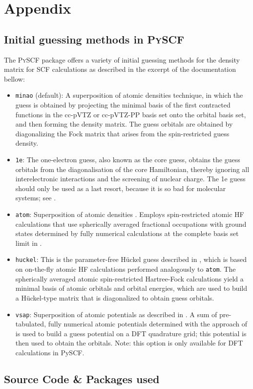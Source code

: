 \appendix
\chapter{Appendix}
\label{sec:appendix}

\section{Initial guessing methods in \textsc{PySCF} \parencite{ref:pyscf}}
\label{sec:pyscf_initial_guessing_methods}
The \textsc{PySCF} package offers a variety of initial guessing methods for the density matrix for SCF calculations as described in the excerpt of the documentation \parencite{ref:pyscf_user_guide} bellow: 
\begin{itemize}
    \item \texttt{minao} (default): A superposition of atomic densities \parencite{ref:minao_sad1,ref:minao_sad2} technique, in which the guess is obtained by projecting the minimal basis of the first contracted functions in the cc-pVTZ or cc-pVTZ-PP basis set onto the orbital basis set, and then forming the density matrix. The guess orbitals are obtained by diagonalizing the Fock matrix that arises from the spin-restricted guess density.

    \item \texttt{1e}: The one-electron guess, also known as the core guess, obtains the guess orbitals from the diagonalisation of the core Hamiltonian, thereby ignoring all interelectronic interactions and the screening of nuclear charge. The 1e guess should only be used as a last resort, because it is so bad for molecular systems; see \parencite{ref:Lehtola2019}.

    \item \texttt{atom}: Superposition of atomic densities \parencite{ref:minao_sad1,ref:minao_sad2}. Employs spin-restricted atomic HF calculations that use spherically averaged fractional occupations with ground states determined by fully numerical calculations at the complete basis set limit in \parencite{ref:lethola_fully_numerical_atomic_potentials}.

    \item \texttt{huckel}: This is the parameter-free Hückel guess described in \parencite{ref:Lehtola2019}, which is based on on-the-fly atomic HF calculations performed analogously to \texttt{atom}. The spherically averaged atomic spin-restricted Hartree-Fock calculations yield a minimal basis of atomic orbitals and orbital energies, which are used to build a Hückel-type matrix that is diagonalized to obtain guess orbitals.

    \item \texttt{vsap}: Superposition of atomic potentials as described in \parencite{ref:Lehtola2019}. A sum of pre-tabulated, fully numerical atomic potentials determined with the approach of \parencite{ref:lethola_fully_numerical_atomic_potentials} is used to build a guess potential on a DFT quadrature grid; this potential is then used to obtain the orbitals. Note: this option is only available for DFT calculations in PySCF.
\end{itemize}

\section{Source Code \& Packages used}
\label{sec:source_code_packages}
